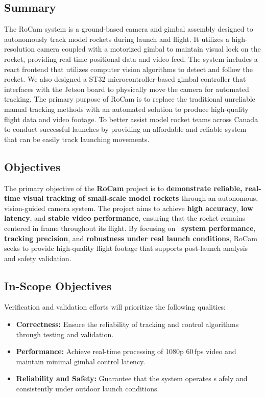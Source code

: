 \documentclass[12pt, titlepage]{article}
\begin{document}
\subsection{Summary}

The RoCam system is a ground-based camera and gimbal assembly designed to
autonomously track model rockets during launch and flight. It utilizes a
high-resolution camera coupled with a motorized gimbal to maintain visual lock
on the rocket, providing real-time positional data and video feed. The system
includes a react frontend that utilizes computer vision algorithms to detect
and follow the rocket. We also designed a ST32 microcontroller-based gimbal
controller that interfaces with the Jetson board to physically move the camera
for automated tracking. The primary purpose of RoCam is to replace the
traditional unreliable manual tracking methods with an automated solution to
produce high-quality flight data and video footage. To better assist model
rocket teams across Canada to conduct successful launches by providing an
affordable and reliable system that can be easily track launching movements.


\subsection{Objectives}
The primary objective of the \textbf{RoCam} project is to \textbf{demonstrate
  reliable, real-time visual tracking of small-scale model rockets} through an
autonomous, vision-guided camera system. The project aims to achieve
\textbf{high accuracy}, \textbf{low latency}, and \textbf{stable video
  performance}, ensuring that the rocket remains centered in frame throughout its
flight. By focusing on \ \textbf{system performance}, \textbf{tracking
  precision}, and \textbf{robustness under real launch conditions}, RoCam seeks
to provide high-quality flight footage that supports post-launch analysis and
safety validation.

\subsection{In-Scope Objectives}
Verification and validation efforts will prioritize the following qualities:
\begin{itemize}
  \item \textbf{Correctness:} Ensure the reliability of tracking and control
        algorithms through testing and validation.
  \item \textbf{Performance:} Achieve real-time processing of 1080p 60\,fps
        video and maintain minimal gimbal control latency.
  \item \textbf{Reliability and Safety:} Guarantee that the system operates s
        afely and consistently under outdoor launch conditions.
\end{itemize}
\end{document}

